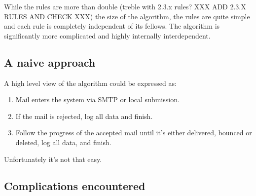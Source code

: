 \documentclass[a4paper,12pt,draft]{article}
\begin{document}
While the rules are more than double (treble with 2.3.x rules? XXX ADD
2.3.X RULES AND CHECK XXX) the size of
the algorithm, the rules are quite simple and each rule is completely
independent of its fellows.  The algorithm is significantly more
complicated and highly internally interdependent.


\subsection{A naive approach}

A high level view of the algorithm could be expressed as:

\begin{enumerate}

    \item Mail enters the system via SMTP or local submission.

    \item If the mail is rejected, log all data and finish.

    \item Follow the progress of the accepted mail until it's either
        delivered, bounced or deleted, log all data, and finish.

\end{enumerate}

Unfortunately it's not that easy.


\subsection{Complications encountered}

\label{complications}
\end{document}
